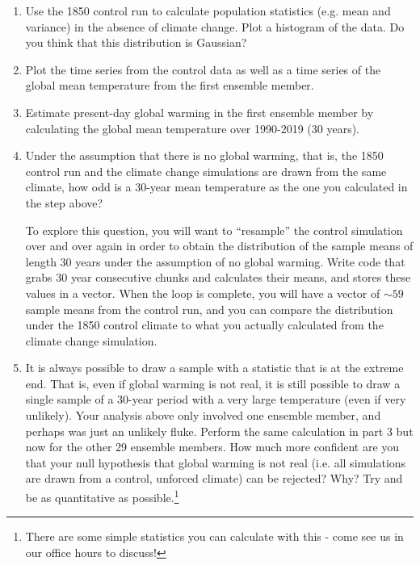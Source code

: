 \begin{enumerate}
\item Use the 1850 control run to calculate population statistics (e.g. mean and variance) in the absence of climate change. Plot a histogram of the data. Do you think that this distribution is Gaussian?
\item Plot the time series from the control data as well as a time series of the global mean temperature from the first ensemble member.
\item Estimate present-day global warming in the first ensemble member by calculating the global mean temperature over 1990-2019 (30 years).
\item Under the assumption that there is no global warming, that is, the 1850 control run and the climate change simulations are drawn from the same climate, how odd is a 30-year mean temperature as the one you calculated in the step above?

To explore this question, you will want to ``resample'' the control simulation over and over again in order to obtain the distribution of the sample means of length 30 years under the assumption of no global warming. Write code that grabs 30 year consecutive chunks and calculates their means, and stores these values in a vector. When the loop is complete, you will have a vector of $\sim 59$ sample means from the control run, and you can compare the distribution under the 1850 control climate to what you actually calculated from the climate change simulation.

\item It is always possible to draw a sample with a statistic that is at the extreme end. That is, even if global warming is not real, it is still possible to draw a single sample of a 30-year period with a very large temperature (even if very unlikely). Your analysis above only involved one ensemble member, and perhaps was just an unlikely fluke. Perform the same calculation in part 3 but now for the other 29 ensemble members. How much more confident are you that your null hypothesis that global warming is not real (i.e. all simulations are drawn from a control, unforced climate) can be rejected? Why? Try and be as quantitative as possible.\footnote{There are some simple statistics you can calculate with this - come see us in our office hours to discuss!}

\end{enumerate}




\clearpage%




